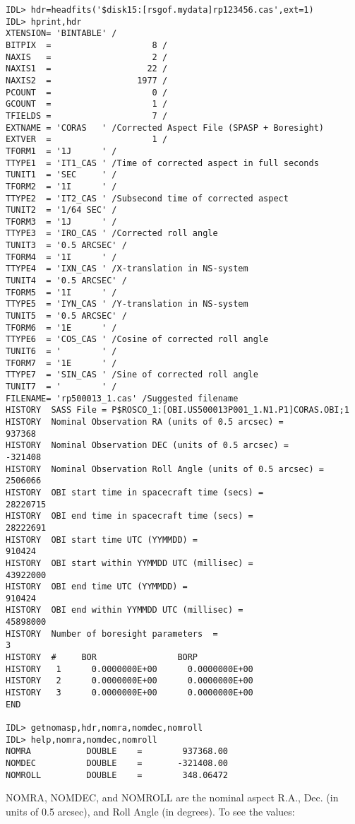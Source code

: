 \medskip\noindent
\begin{verbatim}
IDL> hdr=headfits('$disk15:[rsgof.mydata]rp123456.cas',ext=1)
IDL> hprint,hdr
XTENSION= 'BINTABLE' /
BITPIX  =                    8 /
NAXIS   =                    2 /
NAXIS1  =                   22 /
NAXIS2  =                 1977 /
PCOUNT  =                    0 /
GCOUNT  =                    1 /
TFIELDS =                    7 /
EXTNAME = 'CORAS   ' /Corrected Aspect File (SPASP + Boresight)
EXTVER  =                    1 /
TFORM1  = '1J      ' /
TTYPE1  = 'IT1_CAS ' /Time of corrected aspect in full seconds
TUNIT1  = 'SEC     ' /
TFORM2  = '1I      ' /
TTYPE2  = 'IT2_CAS ' /Subsecond time of corrected aspect
TUNIT2  = '1/64 SEC' /
TFORM3  = '1J      ' /
TTYPE3  = 'IRO_CAS ' /Corrected roll angle
TUNIT3  = '0.5 ARCSEC' /
TFORM4  = '1I      ' /
TTYPE4  = 'IXN_CAS ' /X-translation in NS-system
TUNIT4  = '0.5 ARCSEC' /
TFORM5  = '1I      ' /
TTYPE5  = 'IYN_CAS ' /Y-translation in NS-system
TUNIT5  = '0.5 ARCSEC' /
TFORM6  = '1E      ' /
TTYPE6  = 'COS_CAS ' /Cosine of corrected roll angle
TUNIT6  = '        ' /
TFORM7  = '1E      ' /
TTYPE7  = 'SIN_CAS ' /Sine of corrected roll angle
TUNIT7  = '        ' /
FILENAME= 'rp500013_1.cas' /Suggested filename
HISTORY  SASS File = P$ROSCO_1:[OBI.US500013P001_1.N1.P1]CORAS.OBI;1
HISTORY  Nominal Observation RA (units of 0.5 arcsec) =                 937368
HISTORY  Nominal Observation DEC (units of 0.5 arcsec) =               -321408
HISTORY  Nominal Observation Roll Angle (units of 0.5 arcsec) =        2506066
HISTORY  OBI start time in spacecraft time (secs) =                   28220715
HISTORY  OBI end time in spacecraft time (secs) =                     28222691
HISTORY  OBI start time UTC (YYMMDD) =                                  910424
HISTORY  OBI start within YYMMDD UTC (millisec) =                     43922000
HISTORY  OBI end time UTC (YYMMDD) =                                    910424
HISTORY  OBI end within YYMMDD UTC (millisec) =                       45898000
HISTORY  Number of boresight parameters  =                                   3
HISTORY  #     BOR                BORP
HISTORY   1      0.0000000E+00      0.0000000E+00
HISTORY   2      0.0000000E+00      0.0000000E+00
HISTORY   3      0.0000000E+00      0.0000000E+00
END
 
IDL> getnomasp,hdr,nomra,nomdec,nomroll
IDL> help,nomra,nomdec,nomroll
NOMRA           DOUBLE    =        937368.00
NOMDEC          DOUBLE    =       -321408.00
NOMROLL         DOUBLE    =        348.06472
\end{verbatim}
NOMRA, NOMDEC, and NOMROLL are the nominal aspect R.A., Dec. (in units of 0.5
arcsec), and Roll Angle (in degrees). To see the values:
 
